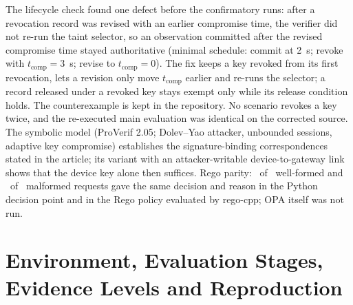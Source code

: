 \documentclass[10pt,a4paper]{article}
\begin{document}
\noindent The lifecycle check found one defect before the confirmatory runs: after a revocation record was revised with an earlier compromise time, the verifier did not re-run the taint selector, so an observation committed after the revised compromise time stayed authoritative (minimal schedule: commit at 2~s; revoke with $t_\mathrm{comp}=3$~s; revise to $t_\mathrm{comp}=0$). The fix keeps a key revoked from its first revocation, lets a revision only move $t_\mathrm{comp}$ earlier and re-runs the selector; a record released under a revoked key stays exempt only while its release condition holds. The counterexample is kept in the repository. No scenario revokes a key twice, and the re-executed main evaluation was identical on the corrected source. The symbolic model (ProVerif 2.05; Dolev--Yao attacker, unbounded sessions, adaptive key compromise) establishes the signature-binding correspondences stated in the article; its variant with an attacker-writable device-to-gateway link shows that the device key alone then suffices. Rego parity: \VParityWellFormedExact\ of \VParityWellFormedN\ well-formed and \VParityMalformedReqExact\ of \VParityMalformedReqN\ malformed requests gave the same decision and reason in the Python decision point and in the Rego policy evaluated by rego-cpp; OPA itself was not run.

\section{Environment, Evaluation Stages, Evidence Levels and Reproduction}\label{sec:S-env}
\begin{table}[!htbp]
\caption{Execution environment recorded in the result manifests. Source digest: SHA-256 over the files in \texttt{src/\allowbreak{}} as recorded by each campaign; repository file names of the runs are given in \texttt{typewriter}. The Rego parity harness used regopy 1.5.2 (rego-cpp 1.5.2); the SQLite library version of the wall-clock runs was not recorded in their manifests. ``Final'' refers to the main-evaluation and performance campaigns; the review-schedule, selective-hold and re-execution campaigns recorded source digest \texttt{8dfae6decd80\ldots} in their manifests (platform kernel 6.18.44, Python 3.13.18; Tables~\ref{tab:S-stages} and~\ref{tab:S-reexec}).\label{tab:S-env}}
\footnotesize\centering

\end{table}
\end{document}
